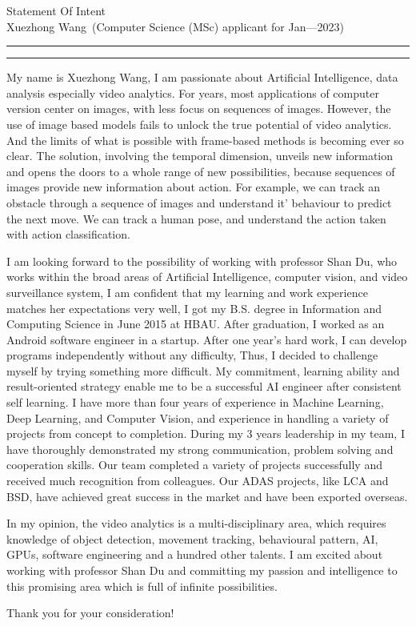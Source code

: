 \documentclass[12pt]{article}
\newcommand{\soptitle}{Statement Of Intent}
\newcommand{\yourname}{Xuezhong Wang}
\begin{document}
\begin{center}\LARGE\soptitle\\
\large \yourname\ (Computer Science (MSc) applicant for Jan---2023)
\end{center}

\hrule
\vspace{1pt}
\hrule height 1pt

\sffamily
\mdseries

\bigskip
My name is Xuezhong Wang, I am passionate about Artificial Intelligence, data analysis especially video analytics. For years, most applications of computer version center on images, with less focus on sequences of images. However, the use of image based models fails to unlock the true potential of video analytics. And the limits of what is possible with frame-based methods is becoming ever so clear. The solution, involving the temporal dimension, unveils new information and opens the doors to a whole range of new possibilities, because sequences of images provide new information about action. For example, we can track an obstacle through a sequence of images and understand it’ behaviour to predict the next move. We can track a human pose, and understand the action taken with action classification.


\bigskip

I am looking forward to the possibility of working with professor Shan Du, who works within the broad areas of Artificial Intelligence, computer vision, and video surveillance system, I am confident that my learning and work experience matches her expectations very well, I got my B.S. degree in Information and Computing Science in June 2015 at HBAU. After graduation, I worked as an Android software engineer in a startup. After one year's hard work, I can develop programs independently without any difficulty, Thus, I decided to challenge myself by trying something more difficult. My commitment, learning ability and result-oriented strategy enable me to be a successful AI engineer after consistent self learning. I have more than four years of experience in Machine Learning, Deep Learning, and Computer Vision, and experience in handling a variety of projects from concept to completion. During my 3 years leadership in my team, I have thoroughly demonstrated my strong communication, problem solving and cooperation skills. Our team completed a variety of projects successfully and received much recognition from colleagues. Our ADAS projects, like LCA and BSD, have achieved great success in the market and have been exported overseas.

\bigskip

In my opinion, the video analytics is a multi-disciplinary area, which requires knowledge of object detection, movement tracking, behavioural pattern,  AI, GPUs, software engineering and a hundred other talents. I am excited about working with professor Shan Du and committing my passion and intelligence to this promising area which is full of infinite possibilities.

\bigskip

Thank you for your consideration!
\end{document}
